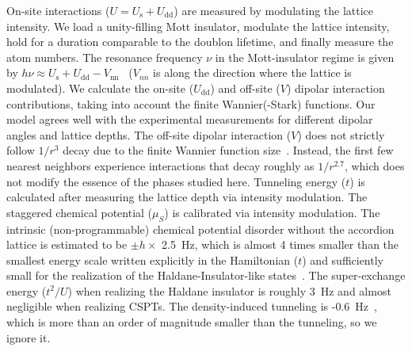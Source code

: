 \documentclass[preprint,superscriptaddress,floatfix, nofootinbib]{revtex4-2}
\begin{document}
On-site interactions ($U=U_\textrm{s}+U_\textrm{dd}$) are measured by modulating the lattice intensity. We load a unity-filling Mott insulator, modulate the lattice intensity, hold for a duration comparable to the doublon lifetime, and finally measure the atom numbers. The resonance frequency $\nu$ in the Mott-insulator regime is given by $h\nu\approx U_\textrm{s}+U_\textrm{dd}-V_\textrm{nn}$~\cite{Chomaz2016} ($V_{nn}$ is along the direction where the lattice is modulated). We calculate the on-site ($U_\textrm{dd}$) and off-site ($V$) dipolar interaction contributions, taking into account the finite Wannier(-Stark) functions. Our model agrees well with the experimental measurements for different dipolar angles and lattice depths. The off-site dipolar interaction ($V$) does not strictly follow $1/r^3$ decay due to the finite Wannier function size~\cite{Wall2013}. Instead, the first few nearest neighbors experience interactions that decay roughly as $1/r^{2.7}$, which does not modify the essence of the phases studied here. Tunneling energy ($t$) is calculated after measuring the lattice depth via intensity modulation. The staggered chemical potential ($\mu_S$) is calibrated via intensity modulation. The intrinsic (non-programmable) chemical potential disorder without the accordion lattice is estimated to be $\pm h\times$ 2.5~Hz, which is almost 4 times smaller than the smallest energy scale written explicitly in the Hamiltonian ($t$) and sufficiently small for the realization of the Haldane-Insulator-like states~\cite{Deng2013, Lv2018}. The super-exchange energy ($t^2/U$) when realizing the Haldane insulator is roughly 3~Hz and almost negligible when realizing CSPTs. The density-induced tunneling is -0.6~Hz~\cite{Baier2016}, which is more than an order of magnitude smaller than the tunneling, so we ignore it.
\end{document}
